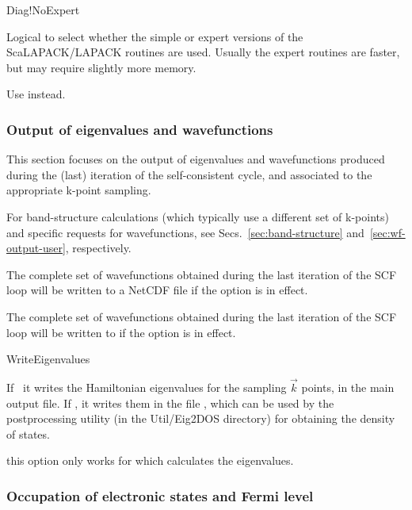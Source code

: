 \begin{fdflogicalF}{Diag!NoExpert}

  Logical to select whether the simple or expert versions of the
  ScaLAPACK/LAPACK routines are used. Usually the expert routines are
  faster, but may require slightly more memory.

  \note Use  instead.

\end{fdflogicalF}



\subsubsection{Output of eigenvalues and wavefunctions}

This section focuses on the output of eigenvalues and wavefunctions
produced during the (last) iteration of the self-consistent cycle,
and associated to the appropriate k-point sampling.

For band-structure calculations (which typically use a different set
of k-points) and specific requests for wavefunctions, see
Secs.~\ref{sec:band-structure} and~\ref{sec:wf-output-user}, respectively.

The complete set of wavefunctions obtained during the last
iteration of the SCF loop will be written to a NetCDF file
 if the  option is in effect.

The complete set of wavefunctions obtained during the last
iteration of the SCF loop will be written to 
if the  option is in effect.


\begin{fdflogicalF}{WriteEigenvalues}

  If \fdftrue\ it writes the Hamiltonian eigenvalues for the sampling
  $\vec k$ points, in the main output file.  If \fdffalse, it
  writes them in the file , which can be used
  by the 
  postprocessing utility (in the Util/Eig2DOS directory) for obtaining
  the density of states.

  \note this option only works for  which
  calculates the eigenvalues.

\end{fdflogicalF}


\subsubsection{Occupation of electronic states and Fermi level}
\label{electronic-occupation}


